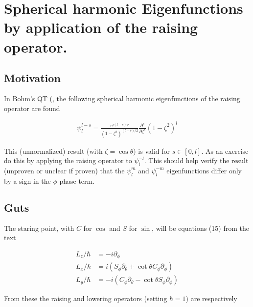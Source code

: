 %

\chapter{Spherical harmonic Eigenfunctions by application of the raising operator.}
\label{chap:sphericalHarmonicRaising}
{}
\date{Aug 18, 2009}

\beginArtNoToc

\section{Motivation}

In Bohm's QT (\cite{bohm1989qt}, the following spherical harmonic eigenfunctions of the raising operator are found

\begin{align}\label{eqn:sphericalHarmonicRaising:foo0}
\psi_l^{l-s} = \frac{e^{i(l-s)\phi}}{(1-\zeta^2)^{(l-s)/2}} \frac{\partial^s}{\partial \zeta^s} (1-\zeta^2)^l
\end{align}

This (unnormalized) result (with $\zeta = \cos\theta$) is valid for $s \in [0,l]$.  As an exercise do this by applying the raising operator to $\psi_l^{-l}$.  This should help verify the result (unproven or unclear if proven) that the $\psi_l^m$ and $\psi_l^{-m}$ eigenfunctions differ only by a sign in the $\phi$ phase term.

\section{Guts}

The staring point, with $C$ for $\cos$ and $S$ for $\sin$, will be equations (15) from the text

\begin{align*}
L_z/\hbar &= -i \partial_\phi \\
L_x/\hbar &= i (S_\phi \partial_\theta + \cot\theta C_\phi \partial_\phi) \\
L_y/\hbar &= -i (C_\phi \partial_\theta - \cot\theta S_\phi \partial_\phi)
\end{align*}

From these the raising and lowering operators (setting $\hbar=1$) are respectively

